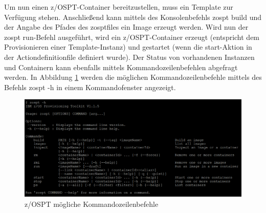 Um nun einen z/OSPT-Container bereitzustellen, muss ein Template zur Verfügung stehen.
Anschließend kann mittels des Konsolenbefehls \glqq zospt build\grqq{} und der Angabe des Pfades des zosptfiles ein Image erzeugt werden.
Wird nun der \glqq zospt run\grqq-Befehl ausgeführt, wird ein z/OSPT-Container erzeugt (entspricht dem Provisionieren einer Template-Instanz) und gestartet (wenn die start-Aktion in der Actiondefinitionfile definiert wurde).
Der Status von vorhandenen Instanzen und Containern kann ebenfalls mittels Kommandozeilenbefehlen abgefragt werden.
In Abbildung \ref{fig:zospt_help} werden die möglichen Kommandozeilenbefehle mittels des Befehls \glqq zospt -h\grqq{} in einem Kommandofenster angezeigt. 
\begin{figure}[ht!]
	\centering
	\includegraphics[width=\textwidth]{figures/zospt_help_putty.png}
	\caption{z/OSPT mögliche Kommandozeilenbefehle}
	\label{fig:zospt_help}
\end{figure}
